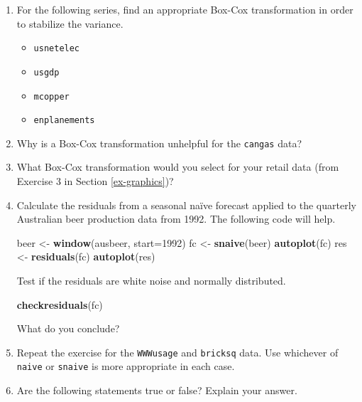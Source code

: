 \documentclass[]{book}
\newenvironment{Shaded}{\begin{snugshade}}{\end{snugshade}}
\newcommand{\DataTypeTok}[1]{\textcolor[rgb]{0.13,0.29,0.53}{#1}}
\newcommand{\DecValTok}[1]{\textcolor[rgb]{0.00,0.00,0.81}{#1}}
\newcommand{\KeywordTok}[1]{\textcolor[rgb]{0.13,0.29,0.53}{\textbf{#1}}}
\newcommand{\NormalTok}[1]{#1}
\newcommand{\StringTok}[1]{\textcolor[rgb]{0.31,0.60,0.02}{#1}}
\providecommand{\tightlist}{%
  \setlength{\itemsep}{0pt}\setlength{\parskip}{0pt}}
\begin{document}
\begin{enumerate}
\def\labelenumi{\arabic{enumi}.}
\item
  For the following series, find an appropriate Box-Cox transformation in order to stabilize the variance.

  \begin{itemize}
  \tightlist
  \item
    \texttt{usnetelec}
  \item
    \texttt{usgdp}
  \item
    \texttt{mcopper}
  \item
    \texttt{enplanements}
  \end{itemize}
\item
  Why is a Box-Cox transformation unhelpful for the \texttt{cangas} data?
\item
  What Box-Cox transformation would you select for your retail data (from Exercise 3 in Section \ref{ex-graphics})?
\item
  Calculate the residuals from a seasonal naïve forecast applied to the quarterly Australian beer production data from 1992. The following code will help.

\begin{Shaded}
\begin{Highlighting}[]
\NormalTok{beer <-}\StringTok{ }\KeywordTok{window}\NormalTok{(ausbeer, }\DataTypeTok{start=}\DecValTok{1992}\NormalTok{)}
\NormalTok{fc <-}\StringTok{ }\KeywordTok{snaive}\NormalTok{(beer)}
\KeywordTok{autoplot}\NormalTok{(fc)}
\NormalTok{res <-}\StringTok{ }\KeywordTok{residuals}\NormalTok{(fc)}
\KeywordTok{autoplot}\NormalTok{(res)}
\end{Highlighting}
\end{Shaded}

  Test if the residuals are white noise and normally distributed.

\begin{Shaded}
\begin{Highlighting}[]
\KeywordTok{checkresiduals}\NormalTok{(fc)}
\end{Highlighting}
\end{Shaded}

  What do you conclude?
\item
  Repeat the exercise for the \texttt{WWWusage} and \texttt{bricksq} data. Use whichever of \texttt{naive} or \texttt{snaive} is more appropriate in each case.
\item
  Are the following statements true or false? Explain your answer.


\end{enumerate}
\end{document}
